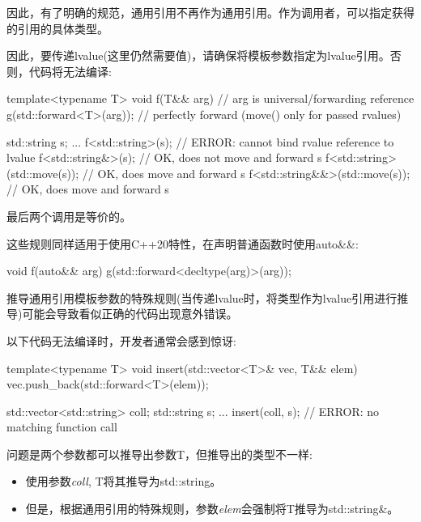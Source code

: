 因此，有了明确的规范，通用引用不再作为通用引用。作为调用者，可以指定获得的引用的具体类型。\par

因此，要传递lvalue(这里仍然需要值)，请确保将模板参数指定为lvalue引用。否则，代码将无法编译:\par

\begin{codebox}[cpp]
template<typename T>
void f(T&& arg) // arg is universal/forwarding reference
{
  g(std::forward<T>(arg)); // perfectly forward (move() only for passed rvalues)
}

std::string s;
...
f<std::string>(s); // ERROR: cannot bind rvalue reference to lvalue
f<std::string&>(s); // OK, does not move and forward s
f<std::string>(std::move(s)); // OK, does move and forward s
f<std::string&&>(std::move(s)); // OK, does move and forward s
\end{codebox}

最后两个调用是等价的。\par

这些规则同样适用于使用C++20特性，在声明普通函数时使用auto\&\&:\par

\begin{codebox}[cpp]
void f(auto&& arg) {
  g(std::forward<decltype(arg)>(arg));
}
\end{codebox}


推导通用引用模板参数的特殊规则(当传递lvalue时，将类型作为lvalue引用进行推导)可能会导致看似正确的代码出现意外错误。\par

以下代码无法编译时，开发者通常会感到惊讶:\par

\begin{codebox}[cpp]
template<typename T>
void insert(std::vector<T>& vec, T&& elem)
{
  vec.push_back(std::forward<T>(elem));
}

std::vector<std::string> coll;
std::string s;
...
insert(coll, s); // ERROR: no matching function call
\end{codebox}

问题是两个参数都可以推导出参数T，但推导出的类型不一样:\par

\begin{itemize}
  \item 使用参数\textit{coll}, T将其推导为std::string。
  \item 但是，根据通用引用的特殊规则，参数\textit{elem}会强制将T推导为std::string\&。
\end{itemize}


